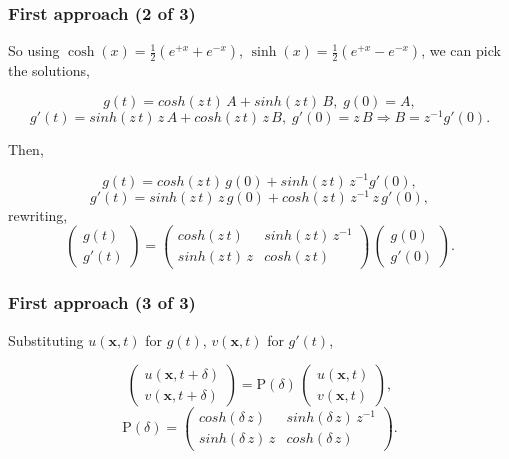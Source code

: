 \documentclass{beamer}
\newcommand{\twomat}[4]{ \left( \begin{array}{cc} #1 & #2 \\ #3 & #4  \end{array} \right) }
\newcommand{\twovec}[2]{ \left( \begin{array}{c} #1  \\ #2   \end{array} \right) }
\begin{document}
\begin{frame}
\frametitle{First approach (2 of 3)}	
\begin{flushleft}
So using $\cosh(x) = \frac{1}{2} ( e^{+x} + e^{-x})$, $\sinh(x) = \frac{1}{2} ( e^{+x} - e^{-x})$, we can pick the solutions,
\end{flushleft}
\begin{equation*}
g(t) = cosh(z \, t) \, A + sinh(z \, t) \, B, \; g(0) = A ,
\end{equation*}
\begin{equation*}
g'(t) = sinh(z \, t) \,z \, A + cosh(z \, t) \,z \, B, \; g'(0) = z \, B \Rightarrow B = z^{-1} g'(0).
\end{equation*}
\begin{flushleft}
Then,
\end{flushleft}
\begin{equation*}
g(t) = cosh(z \, t) \, g(0) + sinh(z \, t) \, z^{-1} g'(0),
\end{equation*}
\begin{equation*}
g'(t) = sinh(z \, t) \,z \, g(0) + cosh(z \, t) \, z^{-1}\,z\, g'(0),
\end{equation*}
rewriting,
\begin{equation*}
\twovec{g(t)}{g'(t)} = \twomat{cosh(z \, t)} {sinh(z \, t) \, z^{-1}} {sinh(z \, t) \,z} {cosh(z \, t)} \, \twovec{g(0)}{g'(0)}.
\end{equation*}
\end{frame}


\begin{frame}
\frametitle{First approach (3 of 3)}
\begin{flushleft}
Substituting $u(\mathbf{x},t)$ for $g(t)$, $v(\mathbf{x},t)$ for $g'(t)$, 
\end{flushleft}
\begin{equation*}
\twovec{ u(\mathbf{x},t+\delta) }{ v(\mathbf{x},t+\delta) } =  \textrm{P}(\delta) \, \twovec{ u(\mathbf{x},t) }{ v(\mathbf{x},t) },
\end{equation*}
\begin{equation*}
\textrm{P}(\delta) = \twomat{cosh(\delta \, z )} {sinh(\delta \, z) \, z^{-1}} {sinh(\delta \, z) \,z} {cosh(\delta \, z	)}.
 \end{equation*}
\end{frame}

\section[Second approach ]{}
\end{document}
